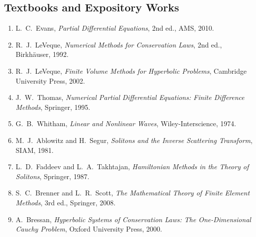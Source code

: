 \subsection*{Textbooks and Expository Works}
\begin{enumerate}
    \item L.\ C.\ Evans, \textit{Partial Differential Equations}, 2nd ed., AMS, 2010.
    \item R.\ J.\ LeVeque, \textit{Numerical Methods for Conservation Laws}, 2nd ed., Birkh\"auser, 1992.
    \item R.\ J.\ LeVeque, \textit{Finite Volume Methods for Hyperbolic Problems}, Cambridge University Press, 2002.
    \item J.\ W.\ Thomas, \textit{Numerical Partial Differential Equations: Finite Difference Methods}, Springer, 1995.
    \item G.\ B.\ Whitham, \textit{Linear and Nonlinear Waves}, Wiley-Interscience, 1974.
    \item M.\ J.\ Ablowitz and H.\ Segur, \textit{Solitons and the Inverse Scattering Transform}, SIAM, 1981.
    \item L.\ D.\ Faddeev and L.\ A.\ Takhtajan, \textit{Hamiltonian Methods in the Theory of Solitons}, Springer, 1987.
    \item S.\ C.\ Brenner and L.\ R.\ Scott, \textit{The Mathematical Theory of Finite Element Methods}, 3rd ed., Springer, 2008.
    \item A.\ Bressan, \textit{Hyperbolic Systems of Conservation Laws: The One-Dimensional Cauchy Problem}, Oxford University Press, 2000.
\end{enumerate}

